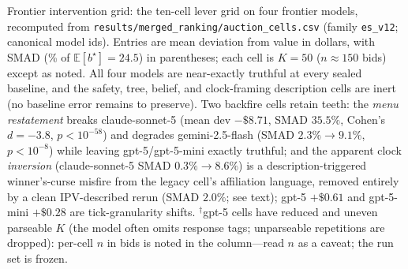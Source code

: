 \begin{table}[htbp]
\caption{Frontier intervention grid: the ten-cell lever grid on four frontier models, recomputed from \texttt{results/merged\_ranking/auction\_cells.csv} (family \texttt{es\_v12}; canonical model ids). Entries are mean deviation from value in dollars, with SMAD (\% of $\mathbb{E}[b^\star]=24.5$) in parentheses; each cell is $K=50$ ($n\approx 150$ bids) except as noted. All four models are near-exactly truthful at every sealed baseline, and the safety, tree, belief, and clock-framing description cells are inert (no baseline error remains to preserve). Two backfire cells retain teeth: the \emph{menu restatement} breaks claude-sonnet-5 (mean dev $-\$8.71$, SMAD $35.5\%$, Cohen's $d=-3.8$, $p<10^{-58}$) and degrades gemini-2.5-flash (SMAD $2.3\%\!\to\!9.1\%$, $p<10^{-8}$) while leaving gpt-5/gpt-5-mini exactly truthful; and the apparent clock \emph{inversion} (claude-sonnet-5 SMAD $0.3\%\!\to\!8.6\%$) is a description-triggered winner's-curse misfire from the legacy cell's affiliation language, removed entirely by a clean IPV-described rerun (SMAD $2.0\%$; see text); gpt-5 $+\$0.61$ and gpt-5-mini $+\$0.28$ are tick-granularity shifts. $^{\dagger}$gpt-5 cells have reduced and uneven parseable $K$ (the model often omits response tags; unparseable repetitions are dropped): per-cell $n$ in bids is noted in the column---read $n$ as a caveat; the run set is frozen.}
\label{tab:frontier-grid}
\end{table}
